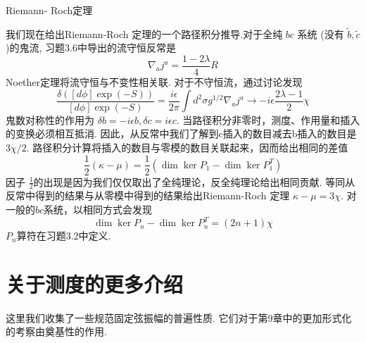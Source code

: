 \centerline{\Large Riemann- Roch定理}
我们现在给出Riemann-Roch 定理的一个路径积分推导.对于全纯 $b c$ 系统 (没有 $\tilde{b}, \tilde{c}$)的鬼流, 习题3.6中导出的流守恒反常是
\begin{equation}
	\nabla_{a} j^{a}=\frac{1-2 \lambda}{4} R
\end{equation}
Noether定理将流守恒与不变性相关联. 对于不守恒流，通过讨论发现
\begin{equation}
	\frac{\delta([d \phi] \exp (-S))}{[d \phi] \exp (-S)}=\frac{i \epsilon}{2 \pi} \int d^{2} \sigma g^{1 / 2} \nabla_{a} j^{a} \rightarrow-i \epsilon \frac{2 \lambda-1}{2} \chi
\end{equation}
鬼数对称性的作用为 $\delta b=-i \epsilon b, \delta c=i \epsilon c $.  当路径积分非零时，测度、作用量和插入的变换必须相互抵消. 因此，从反常中我们了解到c插入的数目减去b插入的数目是$3 \chi / 2 $.  路径积分计算将插入的数目与零模的数目关联起来，因而给出相同的差值
\begin{equation}
	\frac{1}{2}(\kappa-\mu)=\frac{1}{2}\left(\operatorname{dim} \operatorname{ker} P_{1}-\operatorname{dim} \operatorname{ker} P_{1}^{T}\right)
\end{equation}
因子 $\frac{1}{2}$的出现是因为我们仅仅取出了全纯理论，反全纯理论给出相同贡献. 等同从反常中得到的结果与从零模中得到的结果给出Riemann-Roch 定理 $\kappa-\mu=3 \chi$. 对一般的$b c$系统，以相同方式会发现
\begin{equation}
	\operatorname{dim} \operatorname{ker} P_{n}-\operatorname{dim} \operatorname{ker} P_{n}^{T}=(2 n+1) \chi
\end{equation}
$P_{n}$算符在习题3.2中定义.

\section{关于测度的更多介绍}%
这里我们收集了一些规范固定弦振幅的普遍性质. 它们对于第9章中的更加形式化的考察由奠基性的作用.\\

